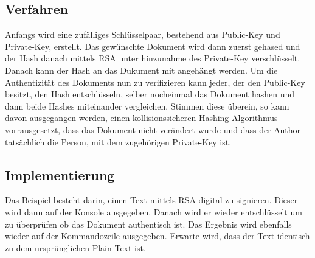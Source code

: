 \documentclass[12pt]{article}
\begin{document}
\subsection{Verfahren}
Anfangs wird eine zufälliges Schlüsselpaar, bestehend aus Public-Key und
Private-Key, erstellt. Das gewünschte Dokument wird dann zuerst gehased 
und der Hash danach mittels RSA unter hinzunahme des Private-Key verschlüsselt.
Danach kann der Hash an das Dukument mit angehängt werden. Um die Authentizität
des Dokuments nun zu verifizieren kann jeder, der den Public-Key besitzt, den
Hash entschlüsseln, selber nocheinmal das Dokument hashen und dann beide Hashes
miteinander vergleichen. Stimmen diese überein, so kann davon ausgegangen
werden, einen kollisionssicheren Hashing-Algorithmus vorrausgesetzt, dass das
Dokument nicht verändert wurde und dass der Author tatsächlich die Person, mit
dem zugehörigen Private-Key ist.

\subsection{Implementierung}
Das Beispiel besteht darin, einen Text mittels RSA digital zu signieren. Dieser
wird dann auf der Konsole ausgegeben. Danach wird er wieder entschlüsselt um zu
überprüfen ob das Dokument authentisch ist. Das Ergebnis wird ebenfalls wieder
auf der Kommandozeile ausgegeben. Erwarte wird, dass der Text identisch zu dem
ursprünglichen Plain-Text ist.
\end{document}
